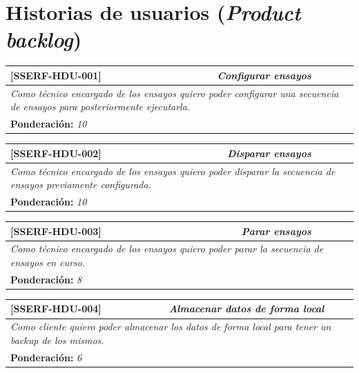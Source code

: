 \documentclass[11pt]{charter}
\begin{document}
\section{Historias de usuarios (\textit{Product backlog})}
\label{sec:backlog}

\begin{table}[H]
\centering
\begin{tabular}{|l|c|}
\hline
\textbf{[SSERF-HDU-001]} & \textit{Configurar ensayos} \\ \hline
\multicolumn{2}{|m{10cm}|}{\textit{Como técnico encargado de los ensayos quiero poder configurar una secuencia de ensayos para posteriormente ejecutarla.}} \\ \hline
\multicolumn{2}{|l|}{\textbf{Ponderación:} \textit{10}} \\ \hline
\end{tabular}
\end{table}

\begin{table}[H]
\centering
\begin{tabular}{|l|c|}
\hline
\textbf{[SSERF-HDU-002]} & \textit{Disparar ensayos} \\ \hline
\multicolumn{2}{|m{10cm}|}{\textit{Como técnico encargado de los ensayos quiero poder disparar la secuencia de ensayos previamente configurada.}} \\ \hline
\multicolumn{2}{|l|}{\textbf{Ponderación:} \textit{10}} \\ \hline
\end{tabular}
\end{table}

\begin{table}[H]
\centering
\begin{tabular}{|l|c|}
\hline
\textbf{[SSERF-HDU-003]} & \textit{Parar ensayos} \\ \hline
\multicolumn{2}{|m{10cm}|}{\textit{Como técnico encargado de los ensayos quiero poder parar la secuencia de ensayos en curso.}} \\ \hline
\multicolumn{2}{|l|}{\textbf{Ponderación:} \textit{8}} \\ \hline
\end{tabular}
\end{table}

\begin{table}[H]
\centering
\begin{tabular}{|l|c|}
\hline
\textbf{[SSERF-HDU-004]} & \textit{Almacenar datos de forma local} \\ \hline
\multicolumn{2}{|m{10cm}|}{\textit{Como cliente quiero poder almacenar los datos de forma local para tener un backup de los mismos.}} \\ \hline
\multicolumn{2}{|l|}{\textbf{Ponderación:} \textit{6}} \\ \hline
\end{tabular}
\end{table}
\end{document}
